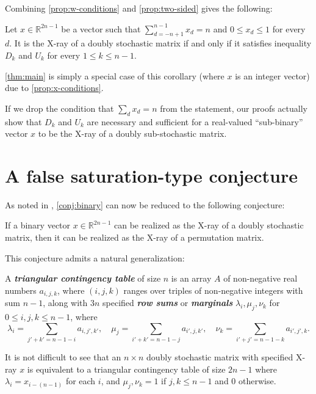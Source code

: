 \documentclass[letterpaper,reqno,11pt]{amsart}
\newcommand{\bfemph}[1]{\textbf{\emph{#1}}}
\begin{document}
Combining \cref{prop:w-conditions} and \cref{prop:two-sided} gives the following:

\begin{corollary}
    Let $x\in \mathbb{R}^{2n-1}$ be a vector such that $\sum_{d=-n+1}^{n-1} x_d = n$ and $0\leq x_d\leq 1$ for every $d$. It is the X-ray of a doubly stochastic matrix if and only if it satisfies inequality $D_k$ and $U_k$ for every $1\leq k\leq n-1$.
\end{corollary}

\cref{thm:main} is simply a special case of this corollary (where $x$ is an integer vector) due to \cref{prop:x-conditions}.

\begin{remark}\label{rem:sub}
    If we drop the condition that $\sum_{d} x_d = n$ from the statement, our proofs actually show that $D_k$ and $U_k$ are necessary and sufficient for a real-valued ``sub-binary'' vector $x$ to be the X-ray of a doubly sub-stochastic matrix.
\end{remark}

\section{A false saturation-type conjecture} \label{sec:sat_conj}

As noted in \cite{Nordh2017}, \cref{conj:binary} can now be reduced to the following conjecture:

\begin{conjecture}\label{conj:ds-to-perm}
    If a binary vector $x\in \mathbb{R}^{2n-1}$ can be realized as the X-ray of a doubly stochastic matrix, then it can be realized as the X-ray of a permutation matrix.
\end{conjecture}

This conjecture admits a natural generalization:

\begin{definition}
    A \bfemph{triangular contingency table} of size $n$ is an array $A$ of non-negative real numbers $a_{i,j,k}$, where $(i, j, k)$ ranges over triples of non-negative integers with sum $n-1$, along with $3n$ specified \bfemph{row sums} or \bfemph{marginals} $\lambda_i, \mu_j, \nu_k$ for $0\leq i, j, k\leq n-1$, where \[\lambda_i = \sum_{j'+k'=n-1-i} a_{i,j',k'}, \quad \mu_j = \sum_{i'+k'=n-1-j} a_{i',j,k'}, \quad \nu_k = \sum_{i'+j'=n-1-k} a_{i',j',k}.\]
\end{definition}

It is not difficult to see that an $n\times n$ doubly stochastic matrix with specified X-ray $x$ is equivalent to a triangular contingency table of size $2n-1$ where $\lambda_i = x_{i-(n-1)}$ for each $i$, and $\mu_j, \nu_k = 1$ if $j, k\leq n-1$ and $0$ otherwise.
\end{document}
